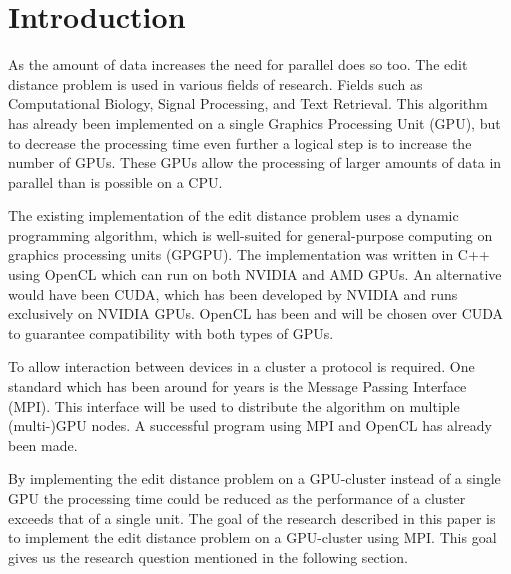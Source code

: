 \documentclass{sig-alternate-br}
\begin{document}


\section{Introduction}
As the amount of data increases the need for parallel does so too. The edit distance problem is used in various fields of research\cite{Navarro:2001:GTA:375360.375365}. Fields such as Computational Biology, Signal Processing, and Text Retrieval.
This algorithm has already been implemented on a single Graphics Processing Unit (GPU)\cite{Heus:GPGPU}, but to decrease the processing time even further a logical step is to increase the number of GPUs\cite{Cluster}.
These GPUs allow the processing of larger amounts of data in parallel than is possible on a CPU. 

The existing implementation of the edit distance problem uses a dynamic programming algorithm, which is well-suited for general-purpose computing on graphics processing units (GPGPU).
The implementation was written in C++ using OpenCL which can run on both NVIDIA and AMD GPUs.
An alternative would have been CUDA, which has been developed by NVIDIA and runs exclusively on NVIDIA GPUs.
OpenCL has been and will be chosen over CUDA to guarantee compatibility with both types of GPUs.

To allow interaction between devices in a cluster a protocol is required. One standard which has been around for years is the Message Passing Interface (MPI).
This interface will be used to distribute the algorithm on multiple (multi-)GPU nodes.
A successful program using MPI and OpenCL has already been made\cite{Cluster}. 

By implementing the edit distance problem on a GPU-cluster instead of a single GPU the processing time could be reduced as the performance of a cluster exceeds that of a single unit\cite{Cluster}.
The goal of the research described in this paper is to implement the edit distance problem on a GPU-cluster using MPI.
This goal gives us the research question mentioned in the following section.
\end{document}
